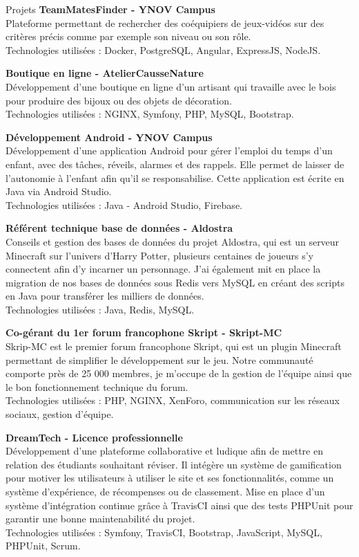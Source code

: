 \documentclass[
	10pt, %
]{resume} %
\begin{document}
\begin{rSection}{Projets}
	{\bf TeamMatesFinder - YNOV Campus}
	\\Plateforme permettant de rechercher des coéquipiers de jeux-vidéos sur des critères précis comme par exemple son niveau ou son rôle.
	\\ Technologies utilisées : Docker, PostgreSQL, Angular, ExpressJS, NodeJS.

	{\bf Boutique en ligne - AtelierCausseNature}
	\\Développement d'une boutique en ligne d'un artisant qui travaille avec le bois pour produire des bijoux ou des objets de décoration.
	\\ Technologies utilisées : NGINX, Symfony, PHP, MySQL, Bootstrap.

	{\bf Développement Android - YNOV Campus}
	\\Développement d'une application Android pour gérer l'emploi du temps d'un enfant, avec des tâches, réveils, alarmes et des rappels. 
	Elle permet de laisser de l'autonomie à l'enfant afin qu'il se responsabilise. Cette application est écrite en Java via Android Studio.
	\\ Technologies utilisées : Java - Android Studio, Firebase.

	{\bf Référent technique base de données - Aldostra}
	\\Conseils et gestion des bases de données du projet Aldostra, qui est un serveur Minecraft sur l'univers d'Harry Potter, plusieurs centaines de joueurs s'y connectent afin d'y incarner un personnage. J'ai également mit en place la migration de nos bases de données sous Redis vers MySQL en créant des scripts en Java pour transférer les milliers de données.
	\\ Technologies utilisées : Java, Redis, MySQL.

	{\bf Co-gérant du 1er forum francophone Skript - Skript-MC}
	\\Skrip-MC est le premier forum francophone Skript, qui est un plugin Minecraft permettant de simplifier le développement sur le jeu. 
	Notre communauté comporte près de 25 000 membres, je m'occupe de la gestion de l'équipe ainsi que le bon fonctionnement technique du forum.
	\\ Technologies utilisées : PHP, NGINX, XenForo, communication sur les réseaux sociaux, gestion d'équipe.

	{\bf DreamTech - Licence professionnelle}
	\\Développement d'une plateforme collaborative et ludique afin de mettre en relation des étudiants souhaitant réviser. 
	Il intégère un système de gamification pour motiver les utilisateurs à utiliser le site et ses fonctionnalités, comme un système d'expérience, de récompenses ou de classement. 
	Mise en place d'un système d'intégration continue grâce à TravisCI ainsi que des tests PHPUnit pour garantir une bonne maintenabilité du projet.
	\\ Technologies utilisées : Symfony, TravisCI, Bootstrap, JavaScript, MySQL, PHPUnit, Scrum.

\end{rSection}
\end{document}
